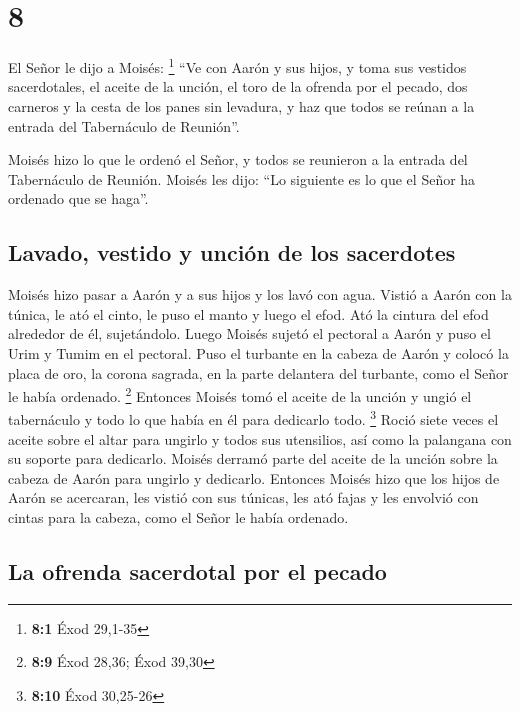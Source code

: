 \hypertarget{section-7}{%
\section{8}\label{section-7}}

 El Señor le dijo a Moisés: \footnote{\textbf{8:1} Éxod
  29,1-35}  ``Ve con Aarón y sus hijos, y toma sus
vestidos sacerdotales, el aceite de la unción, el toro de la ofrenda por
el pecado, dos carneros y la cesta de los panes sin levadura,
 y haz que todos se reúnan a la entrada del Tabernáculo de
Reunión''.

 Moisés hizo lo que le ordenó el Señor, y todos se
reunieron a la entrada del Tabernáculo de Reunión.  Moisés
les dijo: ``Lo siguiente es lo que el Señor ha ordenado que se haga''.

\hypertarget{lavado-vestido-y-unciuxf3n-de-los-sacerdotes}{%
\subsection{Lavado, vestido y unción de los
sacerdotes}\label{lavado-vestido-y-unciuxf3n-de-los-sacerdotes}}

 Moisés hizo pasar a Aarón y a sus hijos y los lavó con
agua.  Vistió a Aarón con la túnica, le ató el cinto, le
puso el manto y luego el efod. Ató la cintura del efod alrededor de él,
sujetándolo.  Luego Moisés sujetó el pectoral a Aarón y
puso el Urim y Tumim en el pectoral.  Puso el turbante en
la cabeza de Aarón y colocó la placa de oro, la corona sagrada, en la
parte delantera del turbante, como el Señor le había ordenado.
\footnote{\textbf{8:9} Éxod 28,36; Éxod 39,30}  Entonces
Moisés tomó el aceite de la unción y ungió el tabernáculo y todo lo que
había en él para dedicarlo todo. \footnote{\textbf{8:10} Éxod 30,25-26}
 Roció siete veces el aceite sobre el altar para ungirlo
y todos sus utensilios, así como la palangana con su soporte para
dedicarlo.  Moisés derramó parte del aceite de la unción
sobre la cabeza de Aarón para ungirlo y dedicarlo. 
Entonces Moisés hizo que los hijos de Aarón se acercaran, les vistió con
sus túnicas, les ató fajas y les envolvió con cintas para la cabeza,
como el Señor le había ordenado.

\hypertarget{la-ofrenda-sacerdotal-por-el-pecado}{%
\subsection{La ofrenda sacerdotal por el
pecado}\label{la-ofrenda-sacerdotal-por-el-pecado}}

